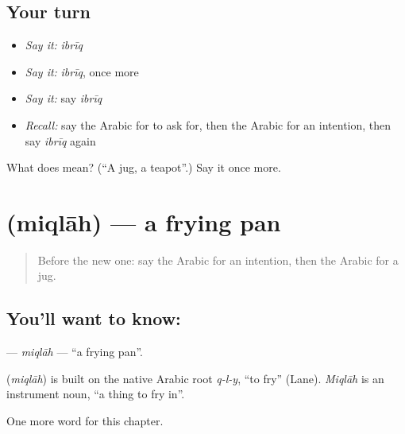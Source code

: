 \subsection*{Your turn}
\begin{itemize}
\raggedright
  \item \emph{Say it:} \emph{ibrīq}
  \item \emph{Say it:} \emph{ibrīq}, once more
  \item \emph{Say it:} say \emph{ibrīq}
  \item \emph{Recall:} say the Arabic for to ask for, then the Arabic for an intention, then say \emph{ibrīq} again
\end{itemize}

\begin{tcolorbox}[breakable,colback=teal!4,colframe=teal!35!black,title={Before you move on}]
What does  mean? (\textquotedblleft{}A jug, a teapot\textquotedblright{}.) Say it once more.
\end{tcolorbox}
\section[\texorpdfstring{\ar{مقلاة} (miqlāh)}{مقلاة (miqlāh)}]{ (miqlāh) — a frying pan}

\label{lesson:AR-C116-miqlah}



\begin{quote}
Before the new one: say the Arabic for an intention, then the Arabic for a jug.
\end{quote}

\subsection*{You'll want to know: }
\textbf{} — \emph{miqlāh} — \textquotedblleft{}a frying pan\textquotedblright{}.

\begin{cousinweb}
\textbf{} (\emph{miqlāh}) is built on the native Arabic root \emph{q-l-y}, \textquotedblleft{}to fry\textquotedblright{} (Lane). \emph{Miqlāh} is an instrument noun, \textquotedblleft{}a thing to fry in\textquotedblright{}.
\end{cousinweb}

\begin{grammarlens}[title={What you've built}]
One more word for this chapter.
\end{grammarlens}


